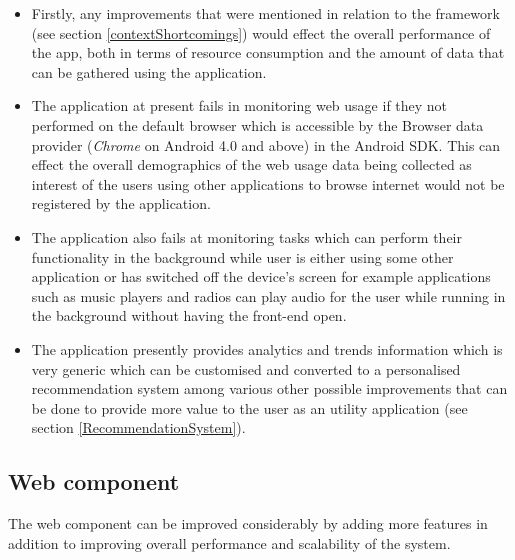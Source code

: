 \documentclass[12pt]{report}
\begin{document}
\begin{itemize}

\item Firstly, any improvements that were mentioned in relation to the framework (see section \ref{contextShortcomings}) would effect the overall performance of the app, both in terms of resource consumption and the amount of data that can be gathered using the application.

\item The application at present fails in monitoring web usage if they not performed on the default browser which is accessible by the Browser data provider (\textit{Chrome} on Android 4.0 and above) in the Android SDK. This can effect the overall demographics of the web usage data being collected as interest of the users using other applications to browse internet would not be registered by the application.

\item The application also fails at monitoring tasks which can perform their functionality in the background while user is either using some other application or has switched off the device's screen for example applications such as music players and radios can play audio for the user while running in the background without having the front-end open.

\item The application presently provides analytics and trends information which is very generic which can be customised and converted to a personalised recommendation system among various other possible improvements that can be done to provide more value to the user as an utility application (see section \ref{RecommendationSystem}).
\end{itemize}

\subsection{Web component}

The web component can be improved considerably by adding more features in addition to improving overall performance and scalability of the system.
\end{document}
